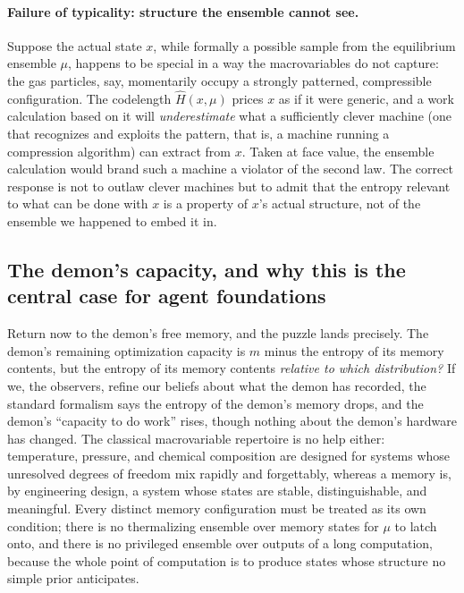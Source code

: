 \documentclass[10pt]{article}
\theoremstyle{definition}
\theoremstyle{remark}
\begin{document}
\paragraph{Failure of typicality: structure the ensemble cannot see.} Suppose the actual state $x$, while formally a possible sample from the equilibrium ensemble $\mu$, happens to be special in a way the macrovariables do not capture: the gas particles, say, momentarily occupy a strongly patterned, compressible configuration. The codelength $\hat H(x,\mu)$ prices $x$ as if it were generic, and a work calculation based on it will \emph{underestimate} what a sufficiently clever machine (one that recognizes and exploits the pattern, that is, a machine running a compression algorithm) can extract from $x$. Taken at face value, the ensemble calculation would brand such a machine a violator of the second law. The correct response is not to outlaw clever machines but to admit that the entropy relevant to what can be done with $x$ is a property of $x$'s actual structure, not of the ensemble we happened to embed it in.

\subsection{The demon's capacity, and why this is the central case for agent foundations}
\label{sec:centralcase}

Return now to the demon's free memory, and the puzzle lands precisely. The demon's remaining optimization capacity is $m$ minus the entropy of its memory contents, but the entropy of its memory contents \emph{relative to which distribution?} If we, the observers, refine our beliefs about what the demon has recorded, the standard formalism says the entropy of the demon's memory drops, and the demon's ``capacity to do work'' rises, though nothing about the demon's hardware has changed. The classical macrovariable repertoire is no help either: temperature, pressure, and chemical composition are designed for systems whose unresolved degrees of freedom mix rapidly and forgettably, whereas a memory is, by engineering design, a system whose states are stable, distinguishable, and meaningful. Every distinct memory configuration must be treated as its own condition; there is no thermalizing ensemble over memory states for $\mu$ to latch onto, and there is no privileged ensemble over outputs of a long computation, because the whole point of computation is to produce states whose structure no simple prior anticipates.
\end{document}
